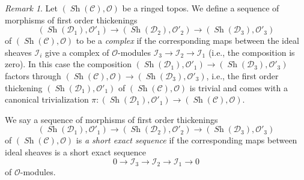 \documentclass{stacks-project}
\theoremstyle{plain}
\theoremstyle{definition}
\theoremstyle{remark}
\newtheorem{remark}[subsection]{Remark}
\numberwithin{equation}{subsection}
\def\Sh{\mathop{\mathit{Sh}}\nolimits}
\begin{document}
\begin{remark}
\label{remark-short-exact-sequence-thickenings-ringed-topoi}
Let $(\Sh(\mathcal{C}), \mathcal{O})$ be a ringed topos.
We define a sequence of morphisms of first order thickenings
$$
(\Sh(\mathcal{D}_1), \mathcal{O}'_1) \to
(\Sh(\mathcal{D}_2), \mathcal{O}'_2) \to
(\Sh(\mathcal{D}_3), \mathcal{O}'_3)
$$
of $(\Sh(\mathcal{C}), \mathcal{O})$ to be a {\it complex}
if the corresponding maps between
the ideal sheaves $\mathcal{I}_i$
give a complex of $\mathcal{O}$-modules
$\mathcal{I}_3 \to \mathcal{I}_2 \to \mathcal{I}_1$
(i.e., the composition is zero). In this case the composition
$(\Sh(\mathcal{D}_1), \mathcal{O}'_1) \to
(\Sh(\mathcal{D}_3), \mathcal{O}'_3)$ factors through
$(\Sh(\mathcal{C}), \mathcal{O}) \to
(\Sh(\mathcal{D}_3), \mathcal{O}'_3)$, i.e.,
the first order thickening
$(\Sh(\mathcal{D}_1), \mathcal{O}'_1)$ of
$(\Sh(\mathcal{C}), \mathcal{O})$ is trivial and comes with
a canonical trivialization
$\pi : (\Sh(\mathcal{D}_1), \mathcal{O}'_1) \to
(\Sh(\mathcal{C}), \mathcal{O})$.

\medskip\noindent
We say a sequence of morphisms of first order thickenings
$$
(\Sh(\mathcal{D}_1), \mathcal{O}'_1) \to
(\Sh(\mathcal{D}_2), \mathcal{O}'_2) \to
(\Sh(\mathcal{D}_3), \mathcal{O}'_3)
$$
of $(\Sh(\mathcal{C}), \mathcal{O})$ is {\it a short exact sequence} if the
corresponding maps between ideal sheaves is a short exact sequence
$$
0 \to \mathcal{I}_3 \to \mathcal{I}_2 \to \mathcal{I}_1 \to 0
$$
of $\mathcal{O}$-modules.
\end{remark}
\end{document}
